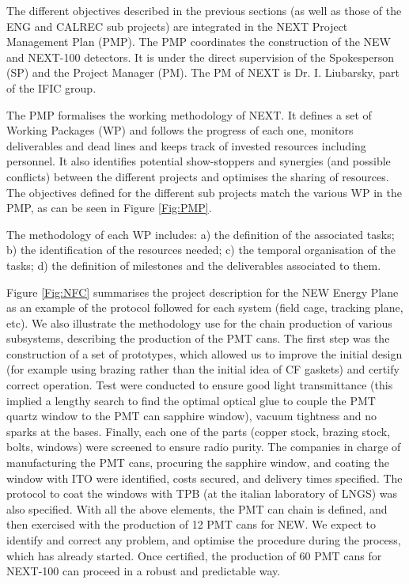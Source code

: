 The different objectives described in the previous sections (as well as those of the ENG and CALREC sub projects) are integrated in the NEXT Project Management Plan (PMP). 
The PMP coordinates the construction of the NEW and NEXT-100 detectors. It is under the direct supervision of the Spokesperson (SP) and the Project Manager (PM). The PM of NEXT is Dr. I. Liubarsky, part of the IFIC group.

The PMP formalises the working methodology of NEXT. It defines a set of Working Packages (WP) and follows the progress of each one, monitors deliverables and dead lines and keeps track of invested resources including personnel. It also identifies potential show-stoppers and synergies (and possible conflicts) between the different projects and optimises the sharing of resources. 
The objectives defined for the different sub projects match the various WP in the PMP, as can be seen in Figure \ref{Fig:PMP}. 

The methodology of each WP includes: a) the definition of the associated tasks; b) the identification of the resources needed; c) the temporal organisation of the tasks; d) the definition of milestones and the deliverables associated to them. 

Figure \ref{Fig:NFC} summarises the project description for the NEW Energy Plane as an example of the protocol followed for each system (field cage, tracking plane, etc). We also illustrate the methodology use for the chain production of various subsystems, describing the
production of the PMT cans. The first step was the construction of a set of prototypes, which allowed us to improve the initial design (for example using brazing rather than the initial idea of CF gaskets) and certify correct operation. Test were conducted to ensure good light transmittance (this implied a lengthy search to find the optimal optical glue to couple the PMT quartz window to the PMT can sapphire window), vacuum tightness and no sparks at the bases. Finally, each one of the parts (copper stock, brazing stock, bolts, windows) were screened to ensure radio purity. The companies in charge of manufacturing the PMT cans, procuring the sapphire window, and coating the window with ITO were identified, costs secured, and delivery times specified. The protocol to coat the windows with TPB (at the italian laboratory of LNGS) was also specified. With all the above elements, the PMT can chain is defined, and then exercised with the production of 12 PMT cans for NEW. We expect to identify and correct any problem, and optimise the procedure during the process, which has already started. Once certified, the production of 60 PMT cans for NEXT-100 can proceed in a robust and predictable way. 

